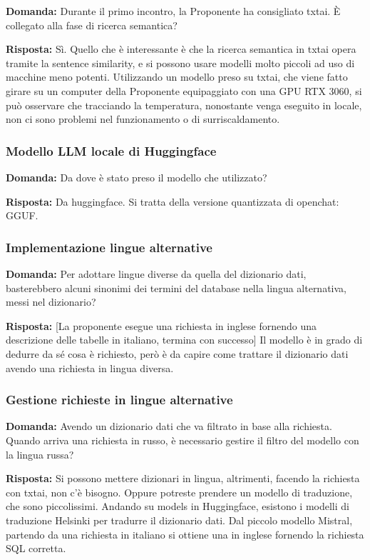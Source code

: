 \textbf{Domanda:} Durante il primo incontro, la Proponente ha consigliato txtai. È collegato alla fase di ricerca semantica?

\textbf{Risposta:} Sì. Quello che è interessante è che la ricerca semantica in txtai opera tramite la sentence similarity, e si possono usare modelli molto piccoli ad uso di macchine meno potenti.
Utilizzando un modello preso su txtai, che viene fatto girare su un computer della Proponente equipaggiato con una GPU RTX 3060, si può osservare che tracciando la temperatura, nonostante venga eseguito in locale, non ci sono problemi nel funzionamento o di surriscaldamento.


\subsubsection{Modello LLM locale di Huggingface}

\textbf{Domanda:} Da dove è stato preso il modello che utilizzato?

\textbf{Risposta:} Da huggingface. Si tratta della versione quantizzata di openchat: GGUF.

\subsubsection{Implementazione lingue alternative}

\textbf{Domanda:} Per adottare lingue diverse da quella del dizionario dati, basterebbero alcuni sinonimi dei termini del database nella lingua alternativa, messi nel dizionario?

\textbf{Risposta:} [La proponente esegue una richiesta in inglese fornendo una descrizione delle tabelle in italiano, termina con successo]
Il modello è in grado di dedurre da sé cosa è richiesto, però è da capire come trattare il dizionario dati avendo una richiesta in lingua diversa.

\subsubsection{Gestione richieste in lingue alternative}

\textbf{Domanda:} Avendo un dizionario dati che va filtrato in base alla richiesta. Quando arriva una richiesta in russo, è necessario gestire il filtro del modello con la lingua russa?

\textbf{Risposta:} Si possono mettere dizionari in lingua, altrimenti, facendo la richiesta con txtai, non c'è bisogno. Oppure potreste prendere un modello di traduzione, che sono piccolissimi. Andando su models in Huggingface, esistono i modelli di traduzione Helsinki per tradurre il dizionario dati.
Dal piccolo modello Mistral, partendo da una richiesta in italiano si ottiene una in inglese fornendo la richiesta SQL corretta.

